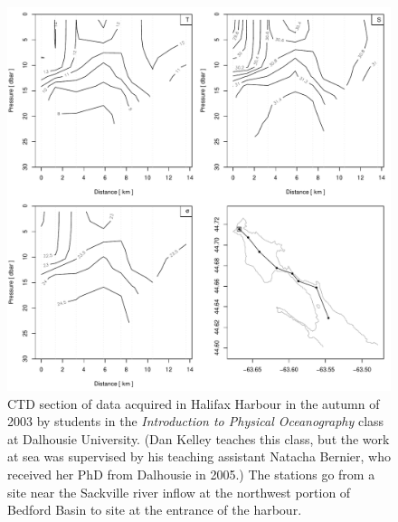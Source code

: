 \documentclass{article}
\begin{document}
\begin{figure}
\begin{center}
\includegraphics{oce-sectionfig}
\end{center}
\caption{CTD section of data acquired in Halifax Harbour in the autumn of 2003
by students in the \emph{Introduction to Physical Oceanography} class at
Dalhousie University.  (Dan Kelley
teaches this class, but the work at sea was
supervised by his teaching assistant
Natacha Bernier, who received her PhD from Dalhousie in 2005.)
The stations go from a site near
the Sackville river inflow at the northwest portion of Bedford Basin
to site at the entrance of the harbour.}
\label{fig:section}
\end{figure}
\end{document}
